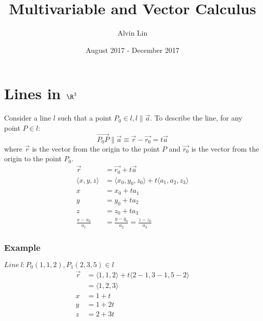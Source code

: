 \documentclass[letterpaper, 12pt]{math}
\title{Multivariable and Vector Calculus}
\author{Alvin Lin}
\date{August 2017 - December 2017}
\begin{document}
\maketitle

\section*{Lines in \( \R^3 \)}
Consider a line \( l \) such that a point \( P_0\in l, l\parallel\vec{a} \).
To describe the line, for any point \( P\in l \):
\[ \vec{P_{0}P}\parallel\vec{a} \equiv \vec{r}-\vec{r_0}=t\vec{a} \]
where \( \vec{r} \) is the vector from the origin to the point \( P \) and
\( \vec{r_0} \) is the vector from the origin to the point \( P_0 \).
\begin{align*}
  \vec{r} &= \vec{r_0}+t\vec{a} \\
  \langle x,y,z\rangle &= \langle x_0,y_0,z_0\rangle+
    t\langle a_1,a_2,z_3\rangle \\
  x &= x_0+ta_1 \\
  y &= y_0+ta_2 \\
  z &= z_0+ta_3 \\
  \frac{x-x_0}{a_1} &= \frac{y-y_0}{a_2} = \frac{z-z_0}{a_3}
\end{align*}

\subsubsection*{Example}
\( Line\ l: P_0(1,1,2), P_1(2,3,5)\in l \)
\begin{align*}
  \vec{r} &= \langle1,1,2\rangle+t\langle2-1,3-1,5-2\rangle \\
  &= \langle1,2,3\rangle \\
  x &= 1+t \\
  y &= 1+2t \\
  z &= 2+3t
\end{align*}
\end{document}
